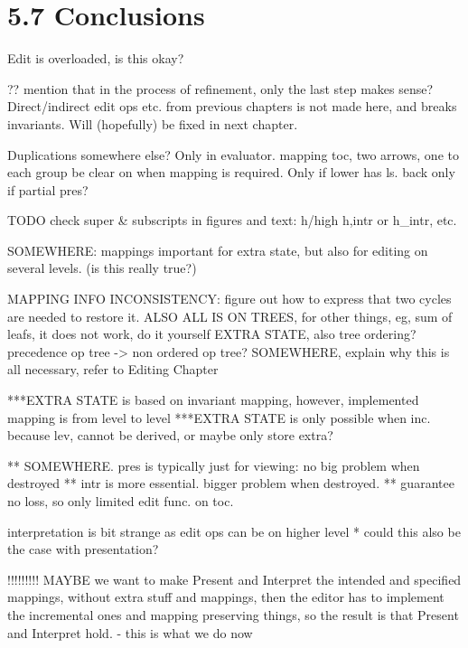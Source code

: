 \section{5.7 Conclusions}










\bc
Edit is overloaded, is this okay?


?? mention that in the process of refinement, only the last step makes sense? Direct/indirect edit ops etc. from previous chapters is not made here, and breaks invariants. Will (hopefully) be fixed in next chapter.


Duplications somewhere else? Only in evaluator.
mapping toc, two arrows, one to each group
be clear on when mapping is required. Only if lower has ls. back only if partial pres?



TODO
check super & subscripts in figures and text: h/high h,intr or h_intr, etc.

SOMEWHERE: mappings important for extra state, but also for editing on several levels. (is this really true?)

MAPPING INFO INCONSISTENCY: figure out how to express that two cycles are needed to restore it.
ALSO ALL IS ON TREES, for other things, eg, sum of leafs, it does not work, do it yourself
EXTRA STATE, also tree ordering? precedence op tree -> non ordered op tree?
SOMEWHERE, explain why this is all necessary, refer to Editing Chapter


***EXTRA STATE is based on invariant mapping, however, implemented mapping is from level to level
***EXTRA STATE is only possible when inc. because lev, cannot be derived, or maybe only store extra?

** SOMEWHERE. pres is typically just for viewing: no big problem when destroyed
** intr is more essential. bigger problem when destroyed.
** guarantee no loss, so only limited edit func. on toc.

interpretation is bit strange as edit ops can be on higher level
* could this also be the case with presentation?


!!!!!!!!!
MAYBE we want to make Present and Interpret the intended and specified mappings, 
without extra stuff and mappings, then the editor has to implement the incremental ones
 and mapping preserving things, so the result is that Present and Interpret hold.
- this is what we do now

